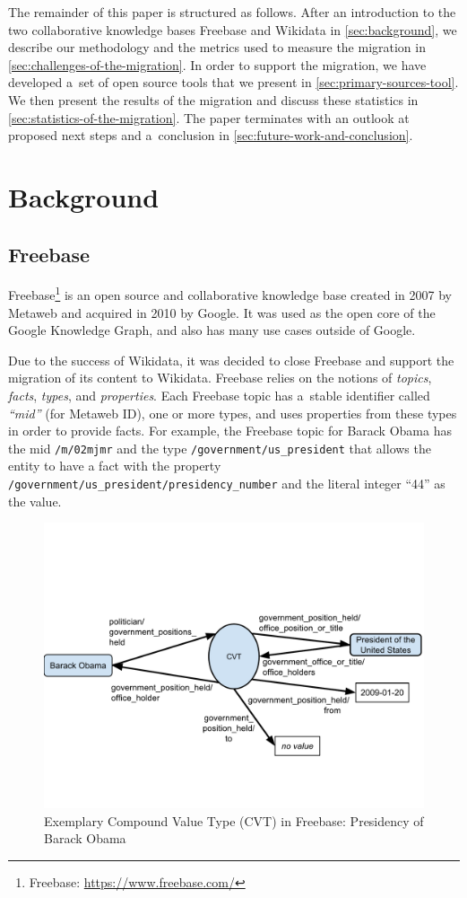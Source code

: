 \documentclass{sig-alternate}
\begin{document}
The remainder of this paper is structured as follows.
After an introduction to the two collaborative knowledge bases
Freebase and Wikidata in \autoref{sec:background},
we describe our methodology and the metrics used to measure the migration
in \autoref{sec:challenges-of-the-migration}.
In order to support the migration, we have developed a~set of open source tools
that we present in \autoref{sec:primary-sources-tool}.
We then present the results of the migration
and discuss these statistics in \autoref{sec:statistics-of-the-migration}.
The paper terminates with an outlook at proposed next steps
and a~conclusion in \autoref{sec:future-work-and-conclusion}.

\section{Background}\label{sec:background}

\subsection{Freebase}

Freebase\footnote{Freebase: \url{https://www.freebase.com/}} is an open source and
collaborative knowledge base created in 2007 by Metaweb and acquired in 2010 by Google.
It was used as the open core of the Google Knowledge Graph,
and also has many use cases outside of Google.

Due to the success of Wikidata,
it was decided to close Freebase and support the migration of its content to Wikidata.
Freebase relies on the notions of \emph{topics}, \emph{facts}, \emph{types}, and \emph{properties}.
Each Freebase topic has a~stable identifier called \emph{``mid''} (for Metaweb ID),
one or more types, and uses properties from these types in order to provide facts.
For example, the Freebase topic for Barack Obama has the mid \texttt{/m/02mjmr}
and the type \texttt{/government/us\_president} that allows the entity to have
a fact with the property \texttt{/government/us\_president/presidency\_number}
and the literal integer ``44'' as the value.

\begin{figure}[!htbp]
\centering
\includegraphics[trim=0cm 3cm 0cm 5cm, width=8.45 cm]{img/freebase-cvt-obama.pdf}
\caption{Exemplary Compound Value Type (CVT) in Freebase: Presidency of Barack Obama}
\label{fig:cvt-obama}
\end{figure}
\end{document}
